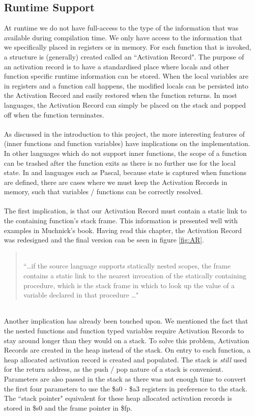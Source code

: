 \subsection{Runtime Support}
At runtime we do not have full-access to the type of the information that was available during compilation time. We only have access to the information that we specifically placed in registers or in memory. For each function that is invoked, a structure is (generally) created called an ``Activation Record". The purpose of an activation record is to have a standardised place where locals and other function specific runtime information can be stored. When the local variables are in registers and a function call happens, the modified locals can be persisted into the Activation Record and easily restored when the function returns. In most languages, the Activation Record can simply be placed on the stack and popped off when the function terminates.
\ \\ \ \\
As discussed in the introduction to this project, the more interesting features of \mmc (inner functions and function variables) have implications on the implementation. In other languages which do not support inner functions, the scope of a function can be trashed after the function exits as there is no further use for the local state. In \mmc and languages such as Pascal, because state is captured when functions are defined, there are cases where we must keep the Activation Records in memory, such that variables / functions can be correctly resolved.
\ \\ \ \\
The first implication, is that our Activation Record must contain a static link to the containing function's stack frame. This information is presented well with examples in Muchnick's book. Having read this chapter, the Activation Record was redesigned and the final version can be seen in figure \ref{fig:AR}.
\begin{quotation}
\ \\
``\ldots if the source language supports statically nested scopes, the frame contains a static link to the nearest invocation of the statically containing procedure, which is the stack frame in which to look up the value of a variable declared in that procedure \ldots"\cite{muchnick1997}
\end{quotation}
\ \\
Another implication has already been touched upon. We mentioned the fact that the nested functions and function typed variables require Activation Records to stay around longer than they would on a stack. To solve this problem, Activation Records are created in the heap instead of the stack. On entry to each function, a heap allocated activation record is created and populated. The stack is \emph{still} used for the return address, as the push / pop nature of a stack is convenient. Parameters are also passed in the stack as there was not enough time to convert the first four parameters to use the \$a0 - \$a3 registers in preference to the stack. The ``stack pointer" equivalent for these heap allocated activation records is stored in \$s0 and the frame pointer in \$fp.

